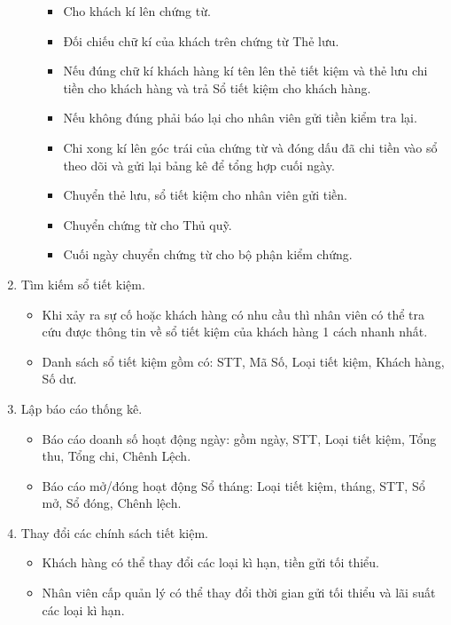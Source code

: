 \documentclass{article}
\begin{document}
\begin{enumerate}
\begin{itemize}
						\begin{itemize}
							\item Cho khách kí lên chứng từ.
							\item Đối chiếu chữ kí của khách trên chứng từ Thẻ lưu.
							\item Nếu đúng chữ kí khách hàng kí tên lên thẻ tiết kiệm và thẻ lưu chi tiền cho khách hàng và trả Sổ tiết kiệm cho khách hàng.
							\item Nếu không đúng phải báo lại cho nhân viên gửi tiền kiểm tra lại.
							\item Chi xong kí lên góc trái của chứng từ và đóng dấu đã chi tiền vào sổ theo dõi và gửi lại bảng kê để tổng hợp cuối ngày.
							\item Chuyển thẻ lưu, sổ tiết kiệm cho nhân viên gửi tiền.
							\item Chuyển chứng từ cho Thủ quỹ.
							\item Cuối ngày chuyển chứng từ cho bộ phận kiểm chứng.
						\end{itemize}
					
				\end{itemize}
			
			\item Tìm kiếm sổ tiết kiệm.
			
				\begin{itemize}
					\item Khi xảy ra sự cố hoặc khách hàng có nhu cầu thì nhân viên có thể tra cứu được thông tin về sổ tiết kiệm của khách hàng 1 cách nhanh nhất.
					\item Danh sách sổ tiết kiệm gồm có: STT, Mã Số, Loại tiết kiệm, Khách hàng, Số dư.
				\end{itemize}
			
			\item Lập báo cáo thống kê.
			
				\begin{itemize}
					\item Báo cáo doanh số hoạt động ngày: gồm ngày, STT, Loại tiết kiệm, Tổng thu, Tổng chi, Chênh Lệch.
					\item Báo cáo mở/đóng hoạt động Sổ tháng: Loại tiết kiệm, tháng, STT, Sổ mở, Sổ đóng, Chênh lệch.
				\end{itemize}
			
			\item Thay đổi các chính sách tiết kiệm.
			
				\begin{itemize}
					\item Khách hàng có thể thay đổi các loại kì hạn, tiền gửi tối thiểu.
					\item Nhân viên cấp quản lý có thể thay đổi thời gian gửi tối thiểu và lãi suất các loại kì hạn.
				\end{itemize}
			
		\end{enumerate}
		
\end{document}
